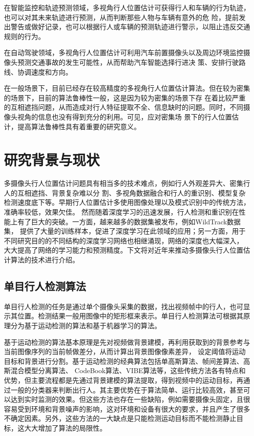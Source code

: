 在智能监控和轨迹预测领域，多视角行人位置估计可获得行人和车辆的行为轨迹，也可以对其未来轨迹进行预测，从而判断那些人物与车辆有意外的危
险，提前发出警告或做好记录，也可以根据行人或车辆的预测轨迹进行警示，以阻止违反交通规则的行为。

在自动驾驶领域，多视角行人位置估计可利用汽车前置摄像头以及周边环境监控摄像头预测交通事故的发生可能性，从而帮助汽车智能选择行进决
策、安排行驶路线、协调速度和方向。

在一般场景下，目前已经存在较高精度的多视角行人位置估计算法。但在较为密集的场景下，目前的算法鲁棒性一般，这是因为较为密集的场景下存
在着比较严重的互相遮挡问题，从而造成对行人特征提取不全、信息缺时的问题。同时，不同摄像头视角的信息也没有得到充分的利用。可见，应对密集场
景下的行人位置估计，提高算法鲁棒性具有着重要的研究意义。



\section{研究背景与现状}

多摄像头行人位置估计问题具有相当多的技术难点，例如行人外观差异大、密集行人的互相遮挡、背景复杂难以分
割、多视角数据融合和行人的重识别、模型复杂检测速度底下等。早期行人位置估计多使用图像处理以及模式识别中的传统方法，准确率较低，效果欠佳。
然而随着深度学习的迅速发展，行人检测和重识别在性能上有了巨大的突破。一方面，越来越多的数据集被发布，例如WildTrack\cite{wildtrack}数据集，
提供了大量的训练样本，促进了深度学习在此领域的应用；另一方面，用于不同研究目的的不同结构的深度学习网络也相继涌现，网络的深度也大幅深入，
大大提高了网络的学习能力和预测精度。下文将对近年来推动多摄像头行人位置估计算法的技术进行介绍。

\subsection{单目行人检测算法}

单目行人检测的任务是通过单个摄像头采集的数据，找出视频帧中的行人，也可显示其位置。检测结果一般用图像中的矩形框来表示。单目行人检测算法可根据其原理分为基于运动检测的算法和基于机器学习的算法。

基于运动检测的算法基本原理是先对视频做背景建模，再利用获取到的背景参考与当前图像序列的当前帧做差分，从而计算出背景图像像素差异，
设定阈值将运动目标和背景进行分割。基于运动检测的经典算法包括单高斯算法、帧间差算法、高斯混合模型分离算法\cite{zivkovic2006efficient}、
CodeBook算法\cite{codebook}、VIBE算法\cite{barnich2010vibe}等，这些传统方法各有特点和优势，但主要流程都是先通过背景建模的算法提取，得到视频中的运动目标，再通过一般的分类器来判断出行人。其主要优势在于算法简单、运行比较高效，甚至可以达到实时监测的效果。但这些方法也存在一些缺陷，例如需要摄像头固定，且很容易受到环境和背景噪声的影响，这对环境和设备有很大的要求，并且产生了很多不确定因素。另外，这些方法的一大缺点是只能检测运动目标而不能检测静止目标，这大大增加了算法的局限性。

